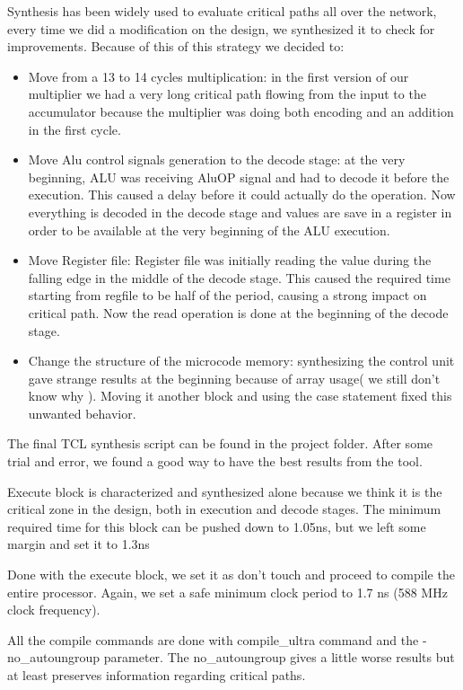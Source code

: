 \documentclass[12pt]{article}
\begin{document}
Synthesis has been widely used to evaluate critical paths all over the network, every time we did a modification on the design, we synthesized it to check for improvements. 
Because of this of this strategy we decided to:
\begin{itemize}
	\item Move from a 13 to 14 cycles multiplication: in the first version of our multiplier we had a very long critical path flowing from the input to the accumulator because the multiplier was doing both encoding and an addition in the first cycle.
	\item Move Alu control signals generation to the decode stage: at the very beginning, ALU was receiving AluOP signal and had to decode it before the execution. This caused a delay before it could actually do the operation. Now everything is decoded in the decode stage and values are save in a register in order to be available at the very beginning of the ALU execution.
	\item Move Register file: Register file was initially reading the value during the falling edge in the middle of the decode stage. This caused the required time starting from regfile to be half of the period, causing a strong impact on critical path. Now the read operation is done at the beginning of the decode stage.
	\item Change the structure of the microcode memory: synthesizing the control unit gave strange results at the beginning because of array usage( we still don't know why ). Moving it another block and using the case statement fixed this unwanted behavior. 
\end{itemize}

The final TCL synthesis script can be found in the project folder. After some trial and error, we found a good way to have the best results from the tool.

Execute block is characterized and synthesized alone because we think it is the critical zone in the design, both in execution and decode stages. 
The minimum required time for this block can be pushed down to 1.05ns, but we left some margin and set it to 1.3ns

Done with the execute block, we set it as don't touch and proceed to compile the entire processor.
Again, we set a safe minimum clock period to 1.7 ns (588 MHz clock frequency).

All the compile commands are done with compile\_ultra command and the -no\_autoungroup parameter. The no\_autoungroup gives a little worse results but at least preserves information regarding critical paths.
\end{document}
